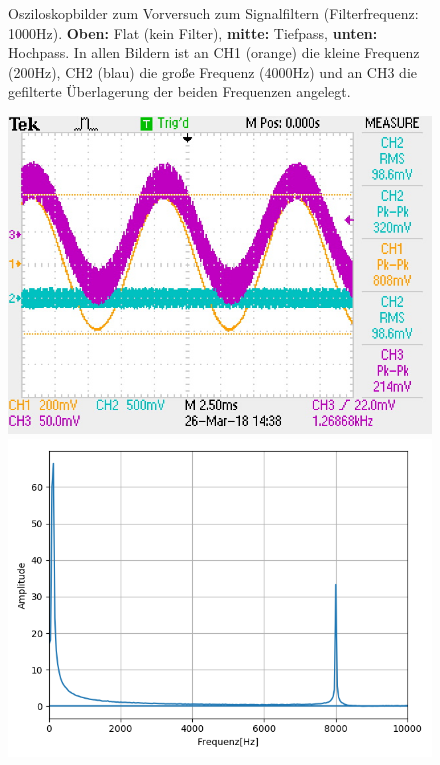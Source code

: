 \documentclass[12pt,a4paper]{article}
\begin{document}
\begin{figure}
\caption{Osziloskopbilder zum Vorversuch zum Signalfiltern (Filterfrequenz: 1000Hz). \textbf{Oben:} Flat (kein Filter), \textbf{mitte:} Tiefpass, \textbf{unten:} Hochpass.
In allen Bildern ist an CH1 (orange) die kleine Frequenz (200Hz), CH2 (blau) die große Frequenz (4000Hz) und an CH3 die gefilterte Überlagerung der beiden Frequenzen angelegt.}
\label{fig:Vor3_Oszi}
\end{figure}

\begin{figure}
\centering
\includegraphics[scale=0.9]{Bilder/Vorversuch3/F0003TEK.JPG}
\includegraphics[scale=0.5]{Bilder/Vorversuch3/Vor3_3.png}

\end{figure}
\end{document}
